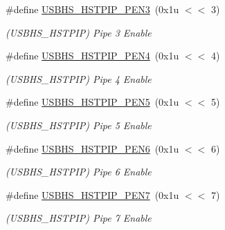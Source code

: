 \begin{DoxyCompactItemize}
\mbox{\label{group__SAMS70__USBHS_ga96beaeeda6d25f9fa3be010d27498b15}} 
\#define \mbox{\hyperlink{group__SAMS70__USBHS_ga96beaeeda6d25f9fa3be010d27498b15}{U\+S\+B\+H\+S\+\_\+\+H\+S\+T\+P\+I\+P\+\_\+\+P\+E\+N3}}~(0x1u $<$$<$ 3)
\begin{DoxyCompactList}\small\item\em (U\+S\+B\+H\+S\+\_\+\+H\+S\+T\+P\+IP) Pipe 3 Enable \end{DoxyCompactList}\item 
\mbox{\label{group__SAMS70__USBHS_ga6888c4a72b7f8dd35a18e00c6a6daacf}} 
\#define \mbox{\hyperlink{group__SAMS70__USBHS_ga6888c4a72b7f8dd35a18e00c6a6daacf}{U\+S\+B\+H\+S\+\_\+\+H\+S\+T\+P\+I\+P\+\_\+\+P\+E\+N4}}~(0x1u $<$$<$ 4)
\begin{DoxyCompactList}\small\item\em (U\+S\+B\+H\+S\+\_\+\+H\+S\+T\+P\+IP) Pipe 4 Enable \end{DoxyCompactList}\item 
\mbox{\label{group__SAMS70__USBHS_gaab5c7f817eb4da9974b885d7b9de06dc}} 
\#define \mbox{\hyperlink{group__SAMS70__USBHS_gaab5c7f817eb4da9974b885d7b9de06dc}{U\+S\+B\+H\+S\+\_\+\+H\+S\+T\+P\+I\+P\+\_\+\+P\+E\+N5}}~(0x1u $<$$<$ 5)
\begin{DoxyCompactList}\small\item\em (U\+S\+B\+H\+S\+\_\+\+H\+S\+T\+P\+IP) Pipe 5 Enable \end{DoxyCompactList}\item 
\mbox{\label{group__SAMS70__USBHS_ga228d055418ac3fa91258155644bef5aa}} 
\#define \mbox{\hyperlink{group__SAMS70__USBHS_ga228d055418ac3fa91258155644bef5aa}{U\+S\+B\+H\+S\+\_\+\+H\+S\+T\+P\+I\+P\+\_\+\+P\+E\+N6}}~(0x1u $<$$<$ 6)
\begin{DoxyCompactList}\small\item\em (U\+S\+B\+H\+S\+\_\+\+H\+S\+T\+P\+IP) Pipe 6 Enable \end{DoxyCompactList}\item 
\mbox{\label{group__SAMS70__USBHS_ga25f985d289cb1cfd228ca1829157ce2a}} 
\#define \mbox{\hyperlink{group__SAMS70__USBHS_ga25f985d289cb1cfd228ca1829157ce2a}{U\+S\+B\+H\+S\+\_\+\+H\+S\+T\+P\+I\+P\+\_\+\+P\+E\+N7}}~(0x1u $<$$<$ 7)
\begin{DoxyCompactList}\small\item\em (U\+S\+B\+H\+S\+\_\+\+H\+S\+T\+P\+IP) Pipe 7 Enable \end{DoxyCompactList}\item 
$$
\end{DoxyCompactItemize}

